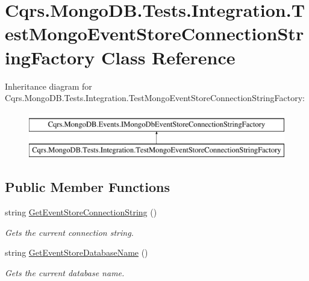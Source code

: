 \hypertarget{classCqrs_1_1MongoDB_1_1Tests_1_1Integration_1_1TestMongoEventStoreConnectionStringFactory}{}\section{Cqrs.\+Mongo\+D\+B.\+Tests.\+Integration.\+Test\+Mongo\+Event\+Store\+Connection\+String\+Factory Class Reference}
\label{classCqrs_1_1MongoDB_1_1Tests_1_1Integration_1_1TestMongoEventStoreConnectionStringFactory}
Inheritance diagram for Cqrs.\+Mongo\+D\+B.\+Tests.\+Integration.\+Test\+Mongo\+Event\+Store\+Connection\+String\+Factory\+:\begin{figure}[H]
\begin{center}
\leavevmode
\includegraphics[height=2.000000cm]{classCqrs_1_1MongoDB_1_1Tests_1_1Integration_1_1TestMongoEventStoreConnectionStringFactory}
\end{center}
\end{figure}
\subsection*{Public Member Functions}
\begin{DoxyCompactItemize}
\item 
string \hyperlink{classCqrs_1_1MongoDB_1_1Tests_1_1Integration_1_1TestMongoEventStoreConnectionStringFactory_a73b68d1160bae4e92bed4445303d6a8f_a73b68d1160bae4e92bed4445303d6a8f}{Get\+Event\+Store\+Connection\+String} ()
\begin{DoxyCompactList}\small\item\em Gets the current connection string. \end{DoxyCompactList}\item 
string \hyperlink{classCqrs_1_1MongoDB_1_1Tests_1_1Integration_1_1TestMongoEventStoreConnectionStringFactory_adbefedfb3bea3521f72333ce47575301_adbefedfb3bea3521f72333ce47575301}{Get\+Event\+Store\+Database\+Name} ()
\begin{DoxyCompactList}\small\item\em Gets the current database name. \end{DoxyCompactList}\end{DoxyCompactItemize}
